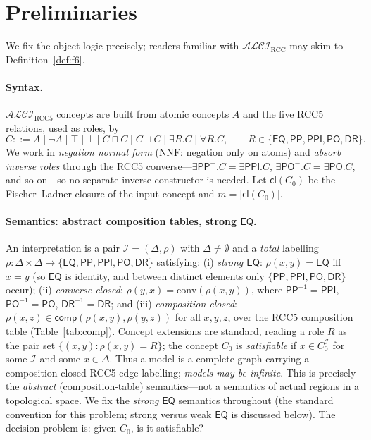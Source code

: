 \documentclass[11pt]{article}
\newcommand{\ALCIRCC}[1]{\mathcal{ALCI}_{\mathrm{RCC#1}}}
\newcommand{\DR}{\mathsf{DR}}
\newcommand{\PO}{\mathsf{PO}}
\newcommand{\PP}{\mathsf{PP}}
\newcommand{\PPI}{\mathsf{PPI}}
\newcommand{\EQ}{\mathsf{EQ}}
\newcommand{\cl}{\ensuremath{\mathsf{cl}}}
\newcommand{\comp}{\ensuremath{\mathsf{comp}}}
\theoremstyle{plain}
\theoremstyle{definition}
\begin{document}
\section{Preliminaries}
\label{sec:prelim}

We fix the object logic precisely; readers familiar with $\ALCIRCC{}$ may
skim to Definition~\ref{def:f6}.

\paragraph{Syntax.} $\ALCIRCC{5}$ concepts are built from atomic concepts
$A$ and the five RCC5 relations, used as roles, by
\[
 C ::= A \mid \neg A \mid \top \mid \bot \mid C\sqcap C \mid C\sqcup C
 \mid \exists R.C \mid \forall R.C,
 \qquad R\in\{\EQ,\PP,\PPI,\PO,\DR\}.
\]
We work in \emph{negation normal form} (NNF: negation only on atoms) and
\emph{absorb inverse roles} through the RCC5 converse---$\exists\PP^{-}.C
=\exists\PPI.C$, $\exists\PO^{-}.C=\exists\PO.C$, and so on---so no
separate inverse constructor is needed. Let $\cl(C_0)$ be the
Fischer--Ladner closure of the input concept and $m=|\cl(C_0)|$.

\paragraph{Semantics: abstract composition tables, strong $\EQ$.} An
interpretation is a pair $\mathcal I=(\Delta,\rho)$ with
$\Delta\neq\emptyset$ and a \emph{total} labelling
$\rho:\Delta\times\Delta\to\{\EQ,\PP,\PPI,\PO,\DR\}$ satisfying:
(i) \emph{strong $\EQ$}: $\rho(x,y)=\EQ$ iff $x=y$ (so $\EQ$ is identity,
and between distinct elements only $\{\PP,\PPI,\PO,\DR\}$ occur);
(ii) \emph{converse-closed}: $\rho(y,x)=\mathrm{conv}(\rho(x,y))$, where
$\PP^{-1}=\PPI$, $\PO^{-1}=\PO$, $\DR^{-1}=\DR$; and
(iii) \emph{composition-closed}: $\rho(x,z)\in\comp(\rho(x,y),\rho(y,z))$
for all $x,y,z$, over the RCC5 composition table (Table~\ref{tab:comp}).
Concept extensions are standard, reading a role $R$ as the pair set
$\{(x,y):\rho(x,y)=R\}$; the concept $C_0$ is \emph{satisfiable} if
$x\in C_0^{\mathcal I}$ for some $\mathcal I$ and some $x\in\Delta$. Thus a
model is a complete graph carrying a composition-closed RCC5
edge-labelling; \emph{models may be infinite}. This is precisely the
\emph{abstract} (composition-table) semantics---not a semantics of actual
regions in a topological space. We fix the \emph{strong} $\EQ$ semantics
throughout (the standard convention for this problem; strong versus weak
$\EQ$ is discussed below). The decision problem is: given $C_0$, is it
satisfiable?
\end{document}
